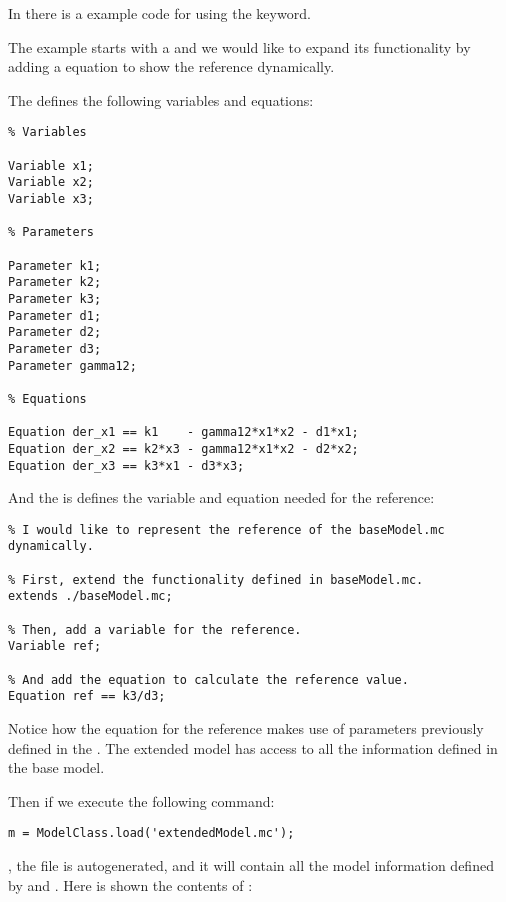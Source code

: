 \documentclass[11pt]{article}
\begin{document}
In  there is a example code for using the  keyword.

The example starts with a  and we would like to expand its functionality by adding a equation to show the reference dynamically.

The  defines the following variables and equations:

\begin{lstlisting}
% Variables

Variable x1;
Variable x2;
Variable x3;

% Parameters

Parameter k1;
Parameter k2;
Parameter k3;
Parameter d1;
Parameter d2;
Parameter d3;
Parameter gamma12;

% Equations

Equation der_x1 == k1    - gamma12*x1*x2 - d1*x1;
Equation der_x2 == k2*x3 - gamma12*x1*x2 - d2*x2;
Equation der_x3 == k3*x1 - d3*x3;
\end{lstlisting}

And the  is defines the variable and equation needed for the reference:

\begin{lstlisting}
% I would like to represent the reference of the baseModel.mc dynamically.

% First, extend the functionality defined in baseModel.mc.
extends ./baseModel.mc;

% Then, add a variable for the reference.
Variable ref;

% And add the equation to calculate the reference value.
Equation ref == k3/d3;
\end{lstlisting}

Notice how the equation for the reference  makes use of parameters previously defined in the . The extended model has access to all the information defined in the base model.

Then if we execute the following command:

\begin{lstlisting}
m = ModelClass.load('extendedModel.mc');
\end{lstlisting}

, the file  is autogenerated, and it will contain all the model information defined by  and . Here is shown the contents of :
\end{document}
